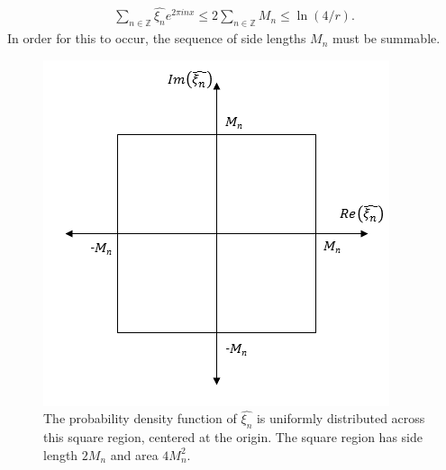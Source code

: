 \begin{align}\label{bdnr}
\sum_{n \in \mathbb{Z}}\hat{\xi_n}e^{2\pi inx} \leq 2\sum_{n \in \mathbb{Z}}M_n \leq \ln(4/r).
\end{align}
In order for this to occur, the sequence of side lengths $M_n$ must be summable. 
\begin{figure}[!h]
\caption[Uniform distribution over a square region]{The probability
  density function of $\hat{\xi_n}$ is uniformly distributed across
  this square region, centered at the origin. The square region has
  side length $2M_n$ and area $4M_n^2$.}\label{fig:square}
	\begin{center}
		\includegraphics[scale=0.7]{figs/square.png}
	\end{center}
\end{figure}

